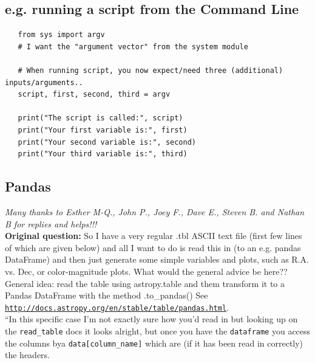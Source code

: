 \documentclass[11pt,a4paper]{article}
\begin{document}
    \subsection{e.g. running a script from the Command Line}
    \begin{lstlisting}
   from sys import argv
   # I want the "argument vector" from the system module

   # When running script, you now expect/need three (additional) inputs/arguments..
   script, first, second, third = argv

   print("The script is called:", script)
   print("Your first variable is:", first)
   print("Your second variable is:", second)
   print("Your third variable is:", third)
   \end{lstlisting}


\newpage
    \subsection{Pandas}

    \smallskip
    \noindent
    {\it Many thanks to Esther M-Q., John P., Joey F., Dave E., Steven B. and Nathan B 
    for replies and helps!!!}\\

    \smallskip
    \noindent
    {\bf Original question:} So I have a very regular .tbl ASCII text
    file (first few lines of which are given below) and all I want to do
    is read this in (to an e.g. pandas DataFrame) and then just generate
    some simple variables and plots, such as R.A. vs. Dec, or
    color-magnitude plots. What would the general advice be here??\\

    \smallskip
    \smallskip
    \noindent
    General idea: read the table using astropy.table and them transform it to a Pandas DataFrame with the method .to\_pandas()
    See \\
    \href{http://docs.astropy.org/en/stable/table/pandas.html}{\tt http://docs.astropy.org/en/stable/table/pandas.html}. \\

    \smallskip
    \smallskip
    \noindent
    ``In this specific case I'm not exactly sure how you'd read in but
    looking up on the {\tt read\_table} docs it looks alright, but once
    you have the {\tt dataframe} you access the columns bya
    {\tt data[column\_name]} which are (if it has been read in correctly) the
    headers. \\
    
\end{document}
